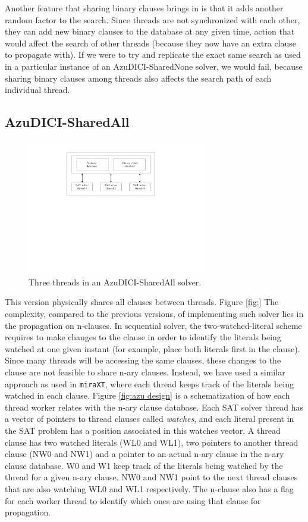 \documentclass[12pt]{diicc}
\begin{document}
Another feature that sharing binary clauses brings in is that it adds another random factor to the search. Since threads are not synchronized with each other, they can add new binary clauses to the database at any given time, action that would affect the search of other threads (because they now have an extra clause to propagate with). If we were to try and replicate the exact same search as used in a particular instance of an AzuDICI-SharedNone solver, we would fail, because sharing binary clauses among threads also affects the search path of each individual thread.

\subsection{AzuDICI-SharedAll}

\begin{figure}[h!]
	\centering
		\includegraphics[width=0.7\textwidth]{sharedall}
	\caption{Three threads in an AzuDICI-SharedAll solver.}
	\label{fig:azu sharedall}
\end{figure}

This version physically shares all clauses between threads. Figure \ref{fig:} The complexity, compared to the previous versions, of implementing such solver lies in the propagation on n-clauses. In sequential solver, the two-watched-literal
scheme requires to make changes to the clause in order to identify
the literals being watched at one given instant (for example, place
both literals first in the clause). Since many threads will be
accessing the same clauses, these changes to the clause are not
feasible to share n-ary clauses. Instead, we have used a similar 
approach as used in
{\tt miraXT}, where each thread keeps track of the literals being
watched in each clause. Figure \ref{fig:azu design} is a
schematization of how each thread worker relates with the n-ary
clause database. Each SAT solver thread has a vector of pointers
to thread clauses called \textit{watches}, and each literal present
in the SAT problem has a position associated in this watches vector.
A thread clause has two watched literals (WL0 and WL1), two
pointers to another thread clause (NW0 and NW1) and a pointer to
an actual n-ary clause in the n-ary clause database. W0 and W1 keep
track of the literals being watched by the thread for a given n-ary
clause. NW0 and NW1 point to the next thread clauses that are also 
watching WL0 and WL1 respectively. The n-clause also has a flag for 
each worker thread to identify which ones are using that clause 
for propagation.
\end{document}
